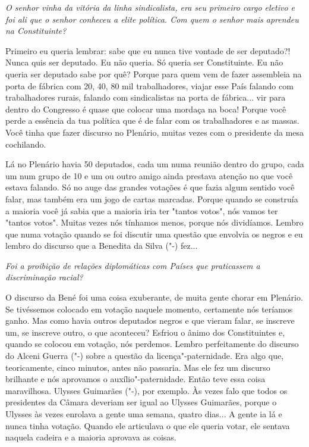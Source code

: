\medskip

\emph{O senhor vinha da vitória da linha sindicalista, era seu
primeiro cargo eletivo e foi ali que o senhor conheceu a elite política.
Com quem o senhor mais aprendeu na Constituinte?}

Primeiro eu queria lembrar: sabe que eu nunca tive
vontade de ser deputado?! Nunca quis ser deputado. Eu não queria. Só
queria ser Constituinte. Eu não queria ser deputado sabe por quê? Porque
para quem vem de fazer assembleia na porta de fábrica com 20, 40, 80 mil
trabalhadores, viajar esse País falando com trabalhadores rurais,
falando com sindicalistas na porta de fábrica... vir para dentro do
Congresso é quase que colocar uma mordaça na boca! Porque você perde a
essência da tua política que é de falar com os trabalhadores e as
massas. Você tinha que fazer discurso no Plenário, muitas vezes com o
presidente da mesa cochilando.

Lá no Plenário havia 50 deputados, cada um numa reunião dentro do grupo,
cada um num grupo de 10 e um ou outro amigo ainda prestava atenção no
que você estava falando. Só no auge das grandes votações é que fazia
algum sentido você falar, mas também era um jogo de cartas marcadas.
Porque quando se construía a maioria você já sabia que a maioria iria
ter "tantos votos", nós vamos ter "tantos votos". Muitas vezes nós
tínhamos menos, porque nós dividíamos. Lembro que numa votação quando se
foi discutir uma questão que envolvia os negros e eu lembro do discurso
que a Benedita da Silva ("-) fez...

\medskip

\emph{Foi a proibição de relações diplomáticas com Países que
praticassem a discriminação racial?}

O discurso da Bené foi uma coisa exuberante, de muita
gente chorar em Plenário. Se tivéssemos colocado em votação naquele
momento, certamente nós teríamos ganho. Mas como havia outros deputados
negros e que vieram falar, se inscreve um, se inscreve outro, o que
aconteceu? Esfriou o ânimo dos Constituintes e, quando se colocou em
votação, nós perdemos. Lembro perfeitamente do discurso do Alceni Guerra
("-) sobre a questão da licença"-paternidade. Era algo que,
teoricamente, cinco minutos, antes não passaria. Mas ele fez um discurso
brilhante e nós aprovamos o auxílio"-paternidade. Então teve essa coisa
maravilhosa. Ulysses Guimarães ("-), por exemplo. Às vezes falo que
todos os presidentes da Câmara deveriam ser igual ao Ulysses Guimarães,
porque o Ulysses às vezes enrolava a gente uma semana, quatro dias... A
gente ia lá e nunca tinha votação. Quando ele articulava o que ele
queria votar, ele sentava naquela cadeira e a maioria aprovava as
coisas.

